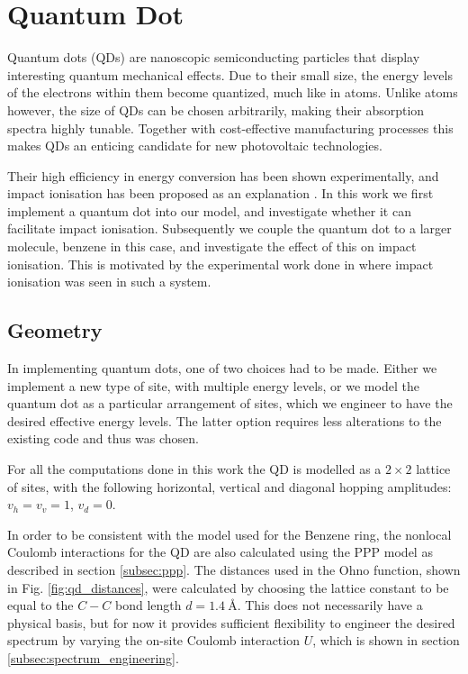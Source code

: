 \section{Quantum Dot}

Quantum dots (QDs) are nanoscopic semiconducting particles that display interesting quantum mechanical effects. Due to their small size, the energy levels of the electrons within them become quantized, much like in atoms. Unlike atoms however, the size of QDs can be chosen arbitrarily, making their absorption spectra highly tunable.  Together with cost-effective manufacturing processes this makes QDs an enticing candidate for new photovoltaic technologies.
\medskip

Their high efficiency in energy conversion has been shown experimentally, and impact ionisation has been proposed as an explanation \cite{impact_io_in_qd}. In this work we first implement a quantum dot into our model, and investigate whether it can facilitate impact ionisation. Subsequently we couple the quantum dot to a larger molecule, benzene in this case, and investigate the effect of this on impact ionisation. This is motivated by the experimental work done in \cite{qd_motivation} where impact ionisation was seen in such a system.

\subsection{Geometry}
 
 In implementing quantum dots, one of two choices had to be made. Either we implement a new type of site, with multiple energy levels, or we model the quantum dot as a particular arrangement of sites, which we engineer to have the desired effective energy levels. The latter option requires less alterations to the existing code and thus was chosen.
 
 \medskip
 
 For all the computations done in this work the QD is modelled as a $2\times 2$ lattice of sites, with the following horizontal, vertical and diagonal hopping amplitudes: $v_h = v_v = 1$, $v_d = 0$.
 
 \medskip
 
 In order to be consistent with the model used for the Benzene ring, the nonlocal Coulomb interactions for the QD are also calculated using the PPP model as described in section \ref{subsec:ppp}. The distances used in the Ohno function, shown in Fig.
 \ref{fig:qd_distances}, were calculated by choosing the lattice constant to be equal to the $C-C$ bond length $d =\SI{1.4}{\angstrom}$. This does not necessarily have a physical basis, but for now it provides sufficient flexibility to engineer the desired spectrum by varying the on-site Coulomb interaction $U$, which is shown in section \ref{subsec:spectrum_engineering}.
 
